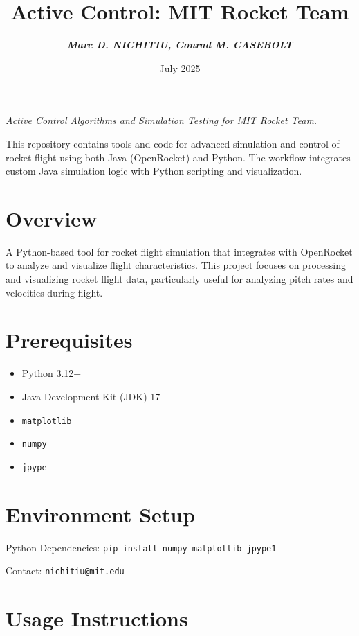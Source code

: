 \documentclass{amsdtx}
\title{\sc Active Control: MIT Rocket Team}
\author{\small \textbf{\textit{Marc D. NICHITIU, Conrad M. CASEBOLT}}}
\date{\sc 19 July 2025}
\providecommand{\tightlist}{%
  \setlength{\itemsep}{0pt}\setlength{\parskip}{0pt}}
\begin{document}
\maketitle

\begin{center}
\textit{Active Control Algorithms and Simulation Testing for MIT Rocket
Team.}
\end{center}

This repository contains tools and code for advanced simulation and
control of rocket flight using both Java (OpenRocket) and Python. The
workflow integrates custom Java simulation logic with Python scripting
and visualization.

\section{Overview}\label{overview}

A Python-based tool for rocket flight simulation that integrates with
OpenRocket to analyze and visualize flight characteristics. This project
focuses on processing and visualizing rocket flight data, particularly
useful for analyzing pitch rates and velocities during flight.

\section{Prerequisites}\label{prerequisites}

\begin{itemize}
\tightlist
\item
  Python 3.12+
\item
  Java Development Kit (JDK) 17
\item
  \texttt{matplotlib}
\item
  \texttt{numpy}
\item
  \texttt{jpype}
\end{itemize}

\section{Environment Setup}\label{environment-setup}

Python Dependencies:
\texttt{pip\ install\ numpy\ matplotlib\ jpype1}

Contact: \verb|nichitiu@mit.edu|

\section{Usage Instructions}
\end{document}
